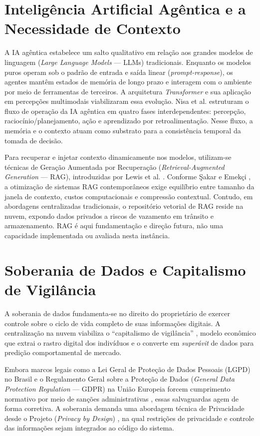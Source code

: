 \documentclass[12pt,openright,twoside,a4paper,english,brazil]{abntex2}
\begin{document}
\section{Inteligência Artificial Agêntica e a Necessidade de Contexto}
A IA agêntica estabelece um salto qualitativo em relação aos grandes modelos de linguagem (\textit{Large Language Models} --- LLMs) tradicionais. Enquanto os modelos puros operam sob o padrão de entrada e saída linear (\textit{prompt-response}), os agentes mantêm estados de memória de longo prazo e interagem com o ambiente por meio de ferramentas de terceiros. A arquitetura \textit{Transformer} \cite{vaswani2017} e sua aplicação em percepções multimodais \cite{khan2022} viabilizaram essa evolução. Nisa et al. \cite{nisa2025} estruturam o fluxo de operação da IA agêntica em quatro fases interdependentes: percepção, raciocínio/planejamento, ação e aprendizado por retroalimentação. Nesse fluxo, a memória e o contexto atuam como substrato para a consistência temporal da tomada de decisão.

Para recuperar e injetar contexto dinamicamente nos modelos, utilizam-se técnicas de Geração Aumentada por Recuperação (\textit{Retrieval-Augmented Generation} --- RAG), introduzidas por Lewis et al. \cite{lewis2020}. Conforme Şakar e Emekçi \cite{sakar2024}, a otimização de sistemas RAG contemporâneos exige equilíbrio entre tamanho da janela de contexto, custos computacionais e compressão contextual. Contudo, em abordagens centralizadas tradicionais, o repositório vetorial de RAG reside na nuvem, expondo dados privados a riscos de vazamento em trânsito e armazenamento. RAG é aqui fundamentação e direção futura, não uma capacidade implementada ou avaliada nesta instância.

\section{Soberania de Dados e Capitalismo de Vigilância}
A soberania de dados fundamenta-se no direito do proprietário de exercer controle sobre o ciclo de vida completo de suas informações digitais. A centralização na nuvem viabiliza o ``capitalismo de vigilância'' \cite{zuboff2019}, modelo econômico que extrai o rastro digital dos indivíduos e o converte em \textit{superávit} de dados para predição comportamental de mercado.

Embora marcos legais como a Lei Geral de Proteção de Dados Pessoais (LGPD) no Brasil e o Regulamento Geral sobre a Proteção de Dados (\textit{General Data Protection Regulation} --- GDPR) na União Europeia forcem cumprimento normativo por meio de sanções administrativas \cite{lorenzon2021}, essas salvaguardas agem de forma corretiva. A soberania demanda uma abordagem técnica de Privacidade desde o Projeto (\textit{Privacy by Design}) \cite{cavoukian2011}, na qual restrições de privacidade e controle das informações sejam integrados ao código do sistema.
\end{document}
